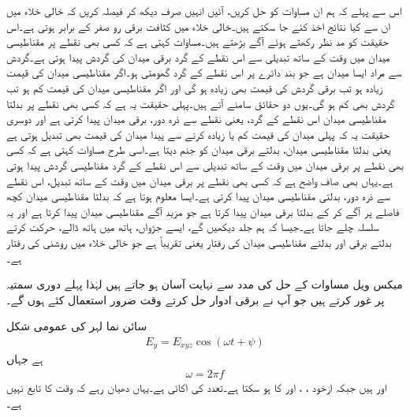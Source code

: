اس سے پہلے کہ ہم ان مساوات کو حل کریں، آئیں انہیں صرف دیکھ کر فیصلہ کریں کہ خالی خلاء میں ان سے  کیا نتائج اخذ کئے جا سکتے ہیں۔خالی خلاء میں کثافت برقی رو   صفر کے برابر ہوتی ہے۔اس حقیقت کو مد نظر رکھتے ہوئے آگے بڑھتے ہیں۔مساوات  کہتی ہے کہ کسی بھی نقطے پر مقناطیسی میدان میں وقت کے ساتھ تبدیلی سے اس نقطے کے گرد برقی میدان کی گردش پیدا ہوتی ہے۔گردش سے مراد ایسا میدان ہے جو بند دائرے پر اس نقطے کے گرد گھومتی ہو۔اگر مقناطیسی میدان کی قیمت زیادہ ہو تب برقی گردش کی قیمت بھی زیادہ ہو گی اور اگر مقناطیسی میدان کی قیمت کم ہو تب گردش بھی کم ہو گی۔یوں دو حقائق سامنے آتے ہیں۔پہلی حقیقت یہ ہے کہ کسی بھی نقطے پر بدلتا مقناطیسی میدان اس نقطے کے گرد، یعنی نقطے سے ذرہ دور، برقی میدان پیدا کرتی ہے اور دوسری حقیقت یہ کہ پہلی میدان کی قیمت کم یا زیادہ کرنے سے پیدا میدان کی قیمت بھی تبدیل ہوتی ہے یعنی بدلتا مقناطیسی میدان، بدلتے برقی میدان کو جنم دیتا ہے۔اسی طرح مساوات  کہتی ہے کہ کسی بھی نقطے پر برقی میدان میں وقت کے ساتھ تبدیلی سے اس نقطے کے گرد مقناطیسی گردش پیدا ہوتی ہے۔یہاں بھی صاف واضح ہے کہ کسی بھی نقطے پر برقی میدان میں وقت کے ساتھ تبدیل، اس نقطے سے ذرہ دور، بدلتی مقناطیسی میدان پیدا کرتی ہے۔ایسا معلوم ہوتا ہے کہ بدلتا مقناطیسی میدان کچھ فاصلے پر آگے کر کے بدلتا برقی میدان پیدا کرتا ہے جو مزید آگے مقناطیسی میدان پیدا کرتا ہے اور یہ سلسلہ چلے جاتا ہے۔جیسا کہ ہم جلد دیکھیں گے، ایسے جڑواں، ہاتھ میں ہاتھ ڈالے، حرکت کرتے بدلتے برقی اور بدلتے مقناطیسی میدان کی رفتار  یعنی تقریباً  ہے جو خالی خلاء میں روشنی کی رفتار ہے۔

میکس ویل مساوات کے حل  کی مدد سے نہایت آسان ہو جاتے ہیں لہٰذا پہلے دوری سمتیہ پر غور کرتے ہیں جو آپ نے برقی ادوار حل کرتے وقت ضرور استعمال کئے ہوں گے۔

سائن نما لہر کی عمومی شکل 
\begin{align}\label{مساوات_موج_اصل_سائن_نما_تفاعل}
E_y =E_{xyz} \cos (\omega t +\psi)
\end{align} 
ہے جہاں
\begin{align}
\omega =2\pi f
\end{align}
 اور   ہیں جبکہ  ازخود ، ،  اور  کا  ہو سکتا ہے۔تعدد  کی اکائی  ہے۔یہاں دھیان رہے کہ  وقت  کا تابع نہیں ہے۔

